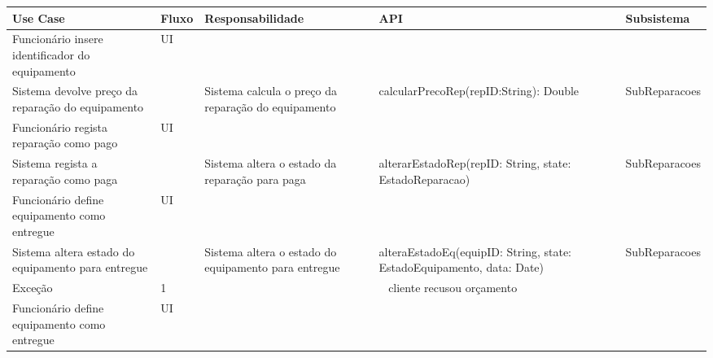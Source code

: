 \documentclass[../relatorio.tex]{subfiles}
\begin{document}
\begin{landscape}
    \begin{table}[!h]
        \centering
        \begin{tabular}{|p{5cm}|p{1cm}|p{4cm}|p{6cm}|p{3cm}|}
            \hline
            \rowcolor{gray!20!white}
            Use Case & Fluxo & Responsabilidade & API & Subsistema \\
            \hline
            \rowcolor{yellow}
            Funcionário insere identificador do equipamento
                     & UI
                     &
                     &
                     &
            \\
            \hline
            Sistema devolve preço da reparação do equipamento
                     &
                     & Sistema calcula o preço da reparação do equipamento
                     & calcularPrecoRep(repID:String): Double
                     & SubReparacoes
            \\
            \hline
            \rowcolor{yellow}
            Funcionário regista reparação como pago
                     & UI
                     &
                     &
                     &
            \\
            \hline
            Sistema regista a reparação como paga
                     & 
                     & Sistema altera o estado da reparação para paga 
                     & alterarEstadoRep(repID: String, state: EstadoReparacao)
                     & SubReparacoes
            \\
            \hline
            \rowcolor{yellow}
            Funcionário define equipamento como entregue
                     & UI
                     &
                     &
                     &
            \\
            \hline
            Sistema altera estado do equipamento para entregue
                     &
                     & Sistema altera o estado do equipamento para entregue
                     & alteraEstadoEq(equipID: String, state: EstadoEquipamento, data: Date)
                     & SubReparacoes
            \\
            \hline
            \rowcolor{red!30}
            Exceção  
                    &
            1           
                    &
            \multicolumn{3}{c}{cliente recusou orçamento}
            \\
            \hline
            \rowcolor{yellow}
            Funcionário define equipamento como entregue
                    & UI
                    &

\end{tabular}
\end{table}
\end{landscape}
\end{document}
